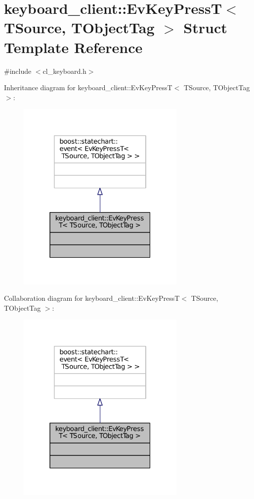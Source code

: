 \hypertarget{structkeyboard__client_1_1EvKeyPressT}{}\section{keyboard\+\_\+client\+:\+:Ev\+Key\+PressT$<$ T\+Source, T\+Object\+Tag $>$ Struct Template Reference}
\label{structkeyboard__client_1_1EvKeyPressT}


{\ttfamily \#include $<$cl\+\_\+keyboard.\+h$>$}



Inheritance diagram for keyboard\+\_\+client\+:\+:Ev\+Key\+PressT$<$ T\+Source, T\+Object\+Tag $>$\+:
\nopagebreak
\begin{figure}[H]
\begin{center}
\leavevmode
\includegraphics[width=232pt]{structkeyboard__client_1_1EvKeyPressT__inherit__graph}
\end{center}
\end{figure}


Collaboration diagram for keyboard\+\_\+client\+:\+:Ev\+Key\+PressT$<$ T\+Source, T\+Object\+Tag $>$\+:
\nopagebreak
\begin{figure}[H]
\begin{center}
\leavevmode
\includegraphics[width=232pt]{structkeyboard__client_1_1EvKeyPressT__coll__graph}
\end{center}
\end{figure}


